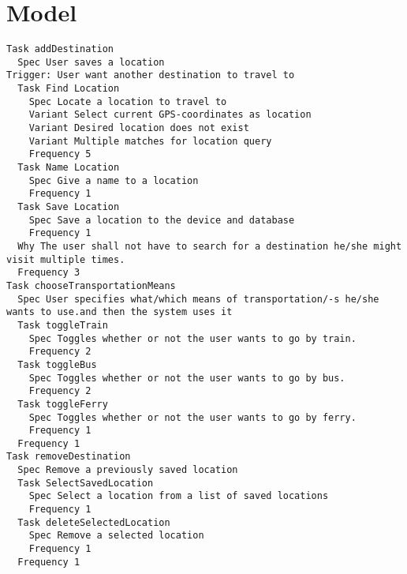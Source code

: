 \chapter{Model}


\begin{lstlisting}
Task addDestination
  Spec User saves a location
Trigger: User want another destination to travel to
  Task Find Location
    Spec Locate a location to travel to
    Variant Select current GPS-coordinates as location
    Variant Desired location does not exist
    Variant Multiple matches for location query
    Frequency 5
  Task Name Location
    Spec Give a name to a location
    Frequency 1
  Task Save Location
    Spec Save a location to the device and database
    Frequency 1
  Why The user shall not have to search for a destination he/she might visit multiple times.
  Frequency 3
Task chooseTransportationMeans
  Spec User specifies what/which means of transportation/-s he/she wants to use.and then the system uses it
  Task toggleTrain
    Spec Toggles whether or not the user wants to go by train.
    Frequency 2
  Task toggleBus
    Spec Toggles whether or not the user wants to go by bus.
    Frequency 2
  Task toggleFerry
    Spec Toggles whether or not the user wants to go by ferry.
    Frequency 1
  Frequency 1
Task removeDestination
  Spec Remove a previously saved location
  Task SelectSavedLocation
    Spec Select a location from a list of saved locations
    Frequency 1
  Task deleteSelectedLocation
    Spec Remove a selected location
    Frequency 1
  Frequency 1

\end{lstlisting}